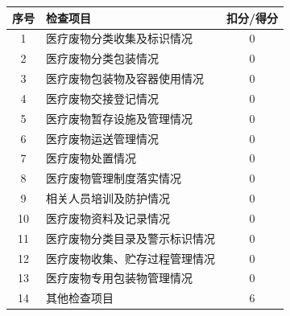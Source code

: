 \documentclass[UTF8,10pt,a4paper,fontset=fandol]{ctexart}
\newcommand{\fieldvalue}[1]{#1}
\newcommand{\handwritten}[1]{#1}
\begin{document}
\noindent
\begin{tabularx}{\textwidth}{|c|X|c|}
\hline
序号 & 检查项目 & 扣分/得分 \\
\hline
1 &
医疗废物分类收集及标识情况 &
\fieldvalue{\handwritten{0}}
\\
\hline
2 &
医疗废物分类包装情况 &
\fieldvalue{\handwritten{0}}
\\
\hline
3 &
医疗废物包装物及容器使用情况 &
\fieldvalue{\handwritten{0}}
\\
\hline
4 &
医疗废物交接登记情况 &
\fieldvalue{\handwritten{0}}
\\
\hline
5 &
医疗废物暂存设施及管理情况 &
\fieldvalue{\handwritten{0}}
\\
\hline
6 &
医疗废物运送管理情况 &
\fieldvalue{\handwritten{0}}
\\
\hline
7 &
医疗废物处置情况 &
\fieldvalue{\handwritten{0}}
\\
\hline
8 &
医疗废物管理制度落实情况 &
\fieldvalue{\handwritten{0}}
\\
\hline
9 &
相关人员培训及防护情况 &
\fieldvalue{\handwritten{0}}
\\
\hline
10 &
医疗废物资料及记录情况 &
\fieldvalue{\handwritten{0}}
\\
\hline
11 &
医疗废物分类目录及警示标识情况 &
\fieldvalue{\handwritten{0}}
\\
\hline
12 &
医疗废物收集、贮存过程管理情况 &
\fieldvalue{\handwritten{0}}
\\
\hline
13 &
医疗废物专用包装物管理情况 &
\fieldvalue{\handwritten{0}}
\\
\hline
14 &
其他检查项目 &
\fieldvalue{\handwritten{6}}
\\
\hline
\end{tabularx}
\end{document}
